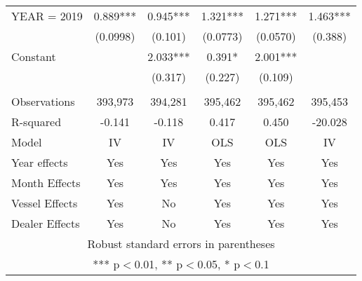\begin{tabular}{lccccc}
YEAR = 2019 & 0.889*** & 0.945*** & 1.321*** & 1.271*** & 1.463*** \\
 & (0.0998) & (0.101) & (0.0773) & (0.0570) & (0.388) \\
Constant &  & 2.033*** & 0.391* & 2.001*** &  \\
 &  & (0.317) & (0.227) & (0.109) &  \\
 &  &  &  &  &  \\
Observations & 393,973 & 394,281 & 395,462 & 395,462 & 395,453 \\
R-squared & -0.141 & -0.118 & 0.417 & 0.450 & -20.028 \\
Model & IV & IV & OLS & OLS & IV \\
Year effects & Yes & Yes & Yes & Yes & Yes \\
Month Effects & Yes & Yes & Yes & Yes & Yes \\
Vessel Effects & Yes & No & Yes & Yes & Yes \\
 Dealer Effects & Yes & No & Yes & Yes & Yes \\ \hline
\multicolumn{6}{c}{ Robust standard errors in parentheses} \\
\multicolumn{6}{c}{ *** p$<$0.01, ** p$<$0.05, * p$<$0.1} \\
\end{tabular}
